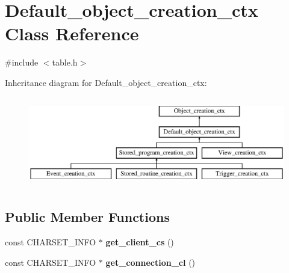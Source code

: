 \hypertarget{classDefault__object__creation__ctx}{}\section{Default\+\_\+object\+\_\+creation\+\_\+ctx Class Reference}
\label{classDefault__object__creation__ctx}


{\ttfamily \#include $<$table.\+h$>$}

Inheritance diagram for Default\+\_\+object\+\_\+creation\+\_\+ctx\+:\begin{figure}[H]
\begin{center}
\leavevmode
\includegraphics[height=3.992870cm]{classDefault__object__creation__ctx}
\end{center}
\end{figure}
\subsection*{Public Member Functions}
\begin{DoxyCompactItemize}
\item 
\mbox{\label{classDefault__object__creation__ctx_acaf6cb03d4d0bdb8ead7c6e738553913}} 
const C\+H\+A\+R\+S\+E\+T\+\_\+\+I\+N\+FO $\ast$ {\bfseries get\+\_\+client\+\_\+cs} ()
\item 
\mbox{\label{classDefault__object__creation__ctx_abd76f37be19e8b327dd083fa56c14001}} 
const C\+H\+A\+R\+S\+E\+T\+\_\+\+I\+N\+FO $\ast$ {\bfseries get\+\_\+connection\+\_\+cl} ()
\end{DoxyCompactItemize}
